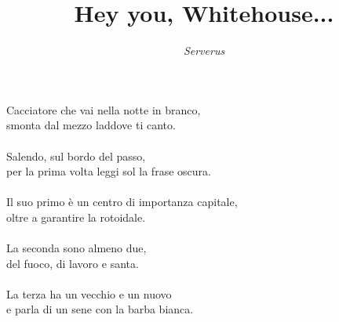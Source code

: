 \documentclass{article}
\title{Hey you, Whitehouse...}
\author{\it Serverus}
\date{}
\begin{document}
\maketitle
\begin{center}
Cacciatore che vai nella notte in branco,\\
smonta dal mezzo laddove ti canto.\\
\ \\
Salendo, sul bordo del passo,\\
per la prima volta leggi sol la frase oscura.\\
\ \\
Il suo primo è un centro di importanza capitale,\\
oltre a garantire la rotoidale.\\
\ \\
La seconda sono almeno due, \\
del fuoco, di lavoro e santa.\\
\ \\
La terza ha un vecchio e un nuovo\\ 
e parla di un sene con la barba bianca.\\
\end{center}
\end{document}
